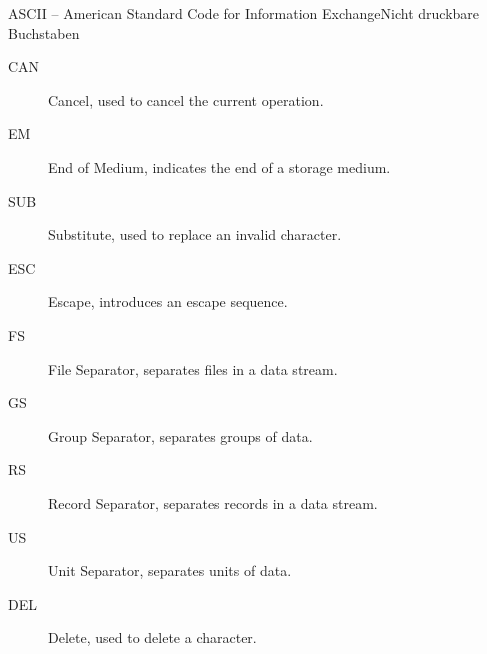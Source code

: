 \documentclass[xelatex,aspectratio=169]{beamer}
\begin{document}
\begin{frame}[allowframebreaks]{ASCII -- American Standard Code for Information Exchange}{Nicht druckbare Buchstaben}
\begin{description}
        \item[CAN] Cancel, used to cancel the current operation.
        \item[EM] End of Medium, indicates the end of a storage medium.
        \item[SUB] Substitute, used to replace an invalid character.
        \item[ESC] Escape, introduces an escape sequence.
        \item[FS] File Separator, separates files in a data stream.
        \item[GS] Group Separator, separates groups of data.
        \item[RS] Record Separator, separates records in a data stream.
        \item[US] Unit Separator, separates units of data.
        \item[DEL] Delete, used to delete a character.
    \end{description}

\end{frame}
\end{document}
